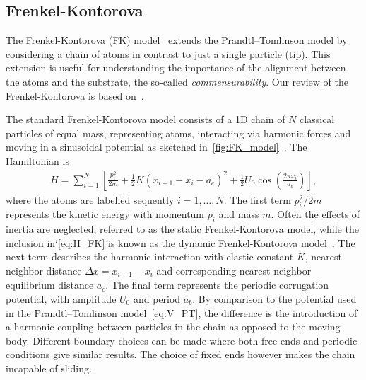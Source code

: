 



\subsection{Frenkel-Kontorova}
The Frenkel-Kontorova (\acrshort{FK}) model~\cite{Frenkel_1938} extends the Prandtl–Tomlinson model by considering a chain of atoms in contrast to just a single particle (tip). This extension is useful for understanding the importance of the alignment between the atoms and the substrate, the so-called \textit{commensurability}. Our review of the Frenkel-Kontorova is based on~\cite{Manini_2016, Vanossi_2013}.

The standard Frenkel-Kontorova model consists of a 1D chain of $N$ classical particles of equal mass, representing atoms, interacting via harmonic forces and moving in a sinusoidal potential as sketched in~\cref{fig:FK_model}~\cite{Manini_2016}. The Hamiltonian is 
\begin{align}
  H = \sum_{i=1}^N \left[\frac{p_i^2}{2m} + \frac{1}{2}K(x_{i+1} - x_i - a_c)^2 + \frac{1}{2}U_0 \cos{\left(\frac{2\pi x_i}{a_b}\right)}\right],
  \label{eq:H_FK}
\end{align}
where the atoms are labelled sequently $i = 1, \hdots, N$. The first term $p_i^2/2m$ represents the kinetic energy with momentum $p_i$
and mass $m$. Often the effects of inertia are neglected, referred to as the static Frenkel-Kontorova model, while the inclusion in‘\cref{eq:H_FK} is known as the dynamic Frenkel-Kontorova model~\cite{FK2D}. The next term describes the harmonic interaction with elastic
constant $K$, nearest neighbor distance $\Delta x = x_{i+1} - x_i$ and 
corresponding nearest neighbor equilibrium distance $a_c$. The final term represents the periodic corrugation potential, with amplitude $U_0$ and period $a_b$. By comparison to the potential used in the Prandtl–Tomlinson model~\cref{eq:V_PT}, the difference is the introduction of a harmonic coupling between particles in the chain as opposed to the moving body. Different boundary choices can be made where both free ends and periodic conditions give similar results. The choice of fixed ends however makes the chain incapable of sliding.

